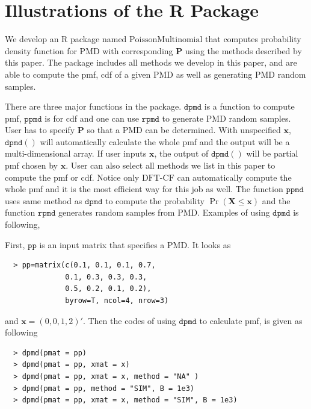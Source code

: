 \documentclass[12pt]{article}
\newcommand{\Pmat}{\mathbf{P}}
\newcommand{\PMD}{\textrm{PMD}}
\newcommand{\Xvec}{\boldsymbol{X}}
\newcommand{\xvec}{\boldsymbol{x}}
\newcommand{\code}{\texttt}
\newcommand{\dft}{{\textrm{DFT-CF}}}
\begin{document}
\section{Illustrations of the R Package}\label{sec:rpackage}
We develop an R package named $\textrm{PoissonMultinomial}$ that computes probability density function for $\PMD$ with corresponding $\Pmat$ using the methods described by this paper. The package includes all methods we develop in this paper, and are able to compute the pmf, cdf of a given $\PMD$ as well as generating $\PMD$ random samples. 

There are three major functions in the package. $\code{dpmd}$ is a function to compute pmf, $\code{ppmd}$ is for cdf and one can use $\code{rpmd}$ to generate $\PMD$ random samples. User has to specify $\Pmat$ so that a $\PMD$ can be determined. With unspecified $\xvec$, $\code{dpmd}( )$ will automatically calculate the whole pmf and the output will be a multi-dimensional array. If user inputs $\xvec$, the output of $\code{dpmd}( )$ will be partial pmf chosen by $\xvec$. User can also select all methods we list in this paper to compute the pmf or cdf. Notice only $\dft$ can automatically compute the whole pmf and it is the most efficient way for this job as well. The function $\code{ppmd}$ uses same method as $\code{dpmd}$ to compute the probability $\Pr(\Xvec \leq \xvec)$ and the function $\code{rpmd}$ generates random samples from $\PMD$.  Examples of using $\code{dpmd}$ is following,

First, $\code{pp}$ is an input matrix that specifies a $\PMD$. It looks as
\begin{verbatim}
  > pp=matrix(c(0.1, 0.1, 0.1, 0.7,
              0.1, 0.3, 0.3, 0.3,
              0.5, 0.2, 0.1, 0.2),
              byrow=T, ncol=4, nrow=3)
\end{verbatim}
and $\xvec=(0,0,1,2)'$. Then the codes of using $\code{dpmd}$ to calculate pmf, is given as following
\begin{verbatim}
  > dpmd(pmat = pp)
  > dpmd(pmat = pp, xmat = x)
  > dpmd(pmat = pp, xmat = x, method = "NA" )
  > dpmd(pmat = pp, method = "SIM", B = 1e3)
  > dpmd(pmat = pp, xmat = x, method = "SIM", B = 1e3)
\end{verbatim}
\end{document}
